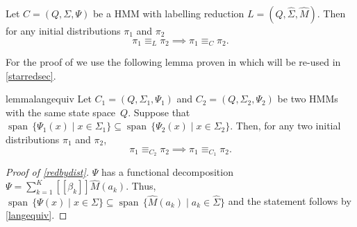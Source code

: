 \documentclass[a4paper,UKenglish,cleveref, autoref,mathscr, amsthm, thmtools, thm-restate]{lipics-v2019}
\newcommand{\1}{\mathbb{I}}
\DeclareMathOperator{\Span}{span\,}
\begin{document}
\begin{proposition}\label{redbydist}
Let $C = (Q, \Sigma, \Psi)$ be a HMM with labelling reduction $L = (Q, \hat{\Sigma}, \hat{M})$. Then for any initial distributions $\pi_1$ and $\pi_2$
\[\pi_1 \equiv_L \pi_2 \implies \pi_1 \equiv_C \pi_2.\]
\end{proposition}
For the proof of  we use the following lemma proven in \cite{darkief20tech} which will be re-used in \cref{starredsec}.

\begin{restatable}{lemma}{langequiv}\label{langequiv}
Let $C_1 = (Q, \Sigma_1, \Psi_1)$ and $C_2 = (Q, \Sigma_2, \Psi_2)$ be two HMMs with the same state space~$Q$.
Suppose that $\Span \{\Psi_1(x) \mid x \in \Sigma_1\} \subseteq \Span \{\Psi_2(x) \mid x \in \Sigma_2\}$.
Then, for any two initial distributions $\pi_1$ and $\pi_2$,
\[\pi_1 \equiv_{C_2} \pi_2 \implies \pi_1 \equiv_{C_1} \pi_2.\]
\end{restatable}
\begin{proof}[Proof of \cref{redbydist}]
$\Psi$ has a functional decomposition $\Psi = \sum_{k = 1}^K [\![\beta_k]\!] \hat{M}(a_k)$.
Thus, $\Span \{\Psi(x) \mid x \in \Sigma\} \subseteq \Span \{\hat{M}(a_k) \mid a_k \in \hat{\Sigma}\}$
and the statement follows by \cref{langequiv}.
\end{proof}
\end{document}

